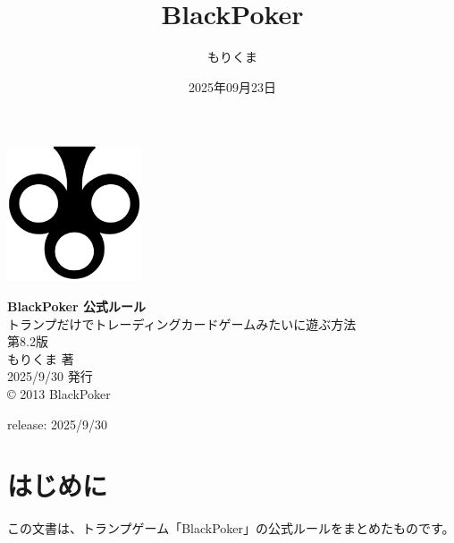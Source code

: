 \documentclass[letterpaper,10pt,dvipdfmx]{sphinxmanual}
\title{BlackPoker}
\date{2025年09月23日}
\author{もりくま}
\begin{document}
\pagestyle{empty}

\begin{titlepage}
\begin{center}
\vspace*{25mm}

\includegraphics[width=4cm]{blackpoker_logo.pdf}  %

\vspace{20mm}
{\Huge \textbf{BlackPoker 公式ルール}}\\[10mm]
{\Large トランプだけでトレーディングカードゲームみたいに遊ぶ方法}\\[30mm]

{\huge 第8.2版}\\[20mm]

{\Large もりくま 著} \\[5mm]
{\Large 2025/9/30 発行}\\[10mm]

{\small © 2013 BlackPoker}

\end{center}
\end{titlepage}

\clearpage
\thispagestyle{empty}  %
\null                  %
\clearpage             %

\pagestyle{plain}
\sphinxtableofcontents
\pagestyle{normal}
\label{\detokenize{index::doc}}


\sphinxAtStartPar
release: 2025/9/30

\sphinxstepscope


\chapter{はじめに}
\label{\detokenize{init/init:init-rst}}\label{\detokenize{init/init:id1}}\label{\detokenize{init/init::doc}}
\sphinxAtStartPar
この文書は、トランプゲーム「BlackPoker」の公式ルールをまとめたものです。
\end{document}
